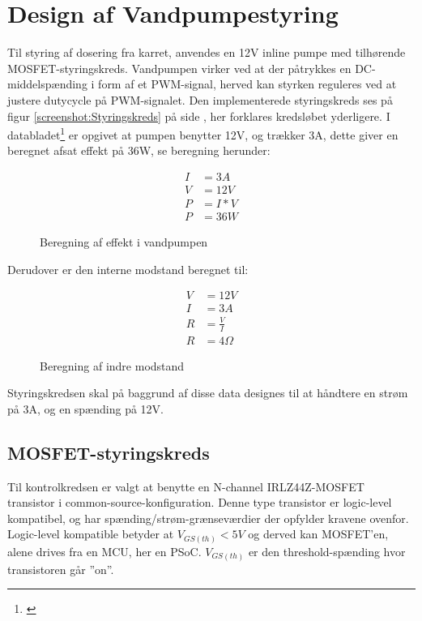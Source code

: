 
\section{Design af Vandpumpestyring}
Til styring af dosering fra karret, anvendes en 12V inline pumpe  med tilhørende MOSFET-styringskreds. 
Vandpumpen virker ved at der påtrykkes en DC-middelspænding i form af et PWM-signal, herved kan styrken reguleres ved at justere dutycycle på PWM-signalet.
Den implementerede styringskreds ses på figur \ref{screenshot:Styringskreds} på side \pageref{screenshot:Styringskreds}, her forklares kredsløbet yderligere.
I databladet\footnote{\citet{biltema:inlinepump}} er opgivet at pumpen benytter 12V, og trækker 3A, dette giver en beregnet afsat effekt på 36W, se beregning herunder:

\begin{figure}[!h]
    \begin{align*}
        I &= 3 A \\ 
        V &= 12 V \\
        P &= I*V \\ 
        P &= 36W
    \end{align*}
\label{eq:PumpeA}
\caption{Beregning af effekt i vandpumpen}
\end{figure}

Derudover er den interne modstand beregnet til:

\begin{figure}[!h]
	\begin{align*}
   		V &= 12 V \\ 
        I &= 3 A \\
        R &= \frac{V}{I} \\ 
        R &= 4 \Omega
  	\end{align*}
\label{eq:pumpeOhm}
\caption{Beregning af indre modstand}
\end{figure}

Styringskredsen skal på baggrund af disse data designes til at håndtere en strøm på 3A, og en spænding på 12V. 


\newpage
\subsection{MOSFET-styringskreds}
Til kontrolkredsen er valgt at benytte en N-channel IRLZ44Z-MOSFET transistor i common-source-konfiguration. Denne type transistor er logic-level kompatibel, og har spænding/strøm-grænseværdier der opfylder kravene ovenfor.  
Logic-level kompatible betyder at $ V_{GS(th)} < 5V $ og derved kan MOSFET'en, alene drives fra en MCU, her en PSoC.
$ V_{GS(th)} $ er den threshold-spænding hvor transistoren går ”on”.


